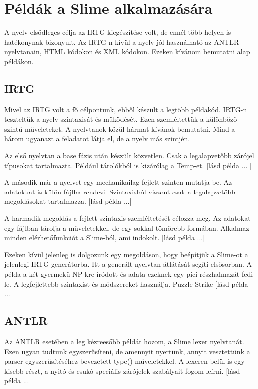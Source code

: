 {%
\section{Példák a Slime alkalmazására}
\label{sec:SExamples}

A nyelv elsődleges célja az IRTG kiegészítése volt, de ennél több helyen is hatékonynak bizonyult.
Az IRTG-n kívül a nyelv jól használható az ANTLR nyelvtanain, HTML kódokon és XML kódokon.
Ezeken kívánom bemutatni alap példákon.


\subsection{IRTG}
\label{sec:SEIRTG}
Mivel az IRTG volt a fő célpontunk, ebből készült a legtöbb példakód.
IRTG-n teszteltük a nyelv szintaxisát és működését.
Ezen szemléltettük a különböző szintű műveleteket.
A nyelvtanok közül hármat kívánok bemutatni.
Mind a három ugyanazt a feladatot látja el, de a nyelv más szintjén.

Az első nyelvtan a base fázis után készült közvetlen.
Csak a legalapvetőbb zárójel típusokat tartalmazta.
Például tárolókból is kizárólag a Temp-et.
[lásd példa ... ]

A második már a nyelvet egy mechanikailag fejlett szinten mutatja be.
Az adatokkat is külön fájlba rendezi.
Szintaxisból viszont csak a legalapvetőbb megoldásokat tartalmazza.
[lásd példa ...]

A harmadik megoldás a fejlett szintaxis szemléltetését célozza meg.
Az adatokat egy fájlban tárolja a műveletekkel, de egy sokkal tömörebb formában.
Alkalmaz minden elérhetőfunkciót a Slime-ból, ami indokolt.
[lásd példa ...]

Ezeken kívül jelenleg is dolgozunk egy megoldáson, hogy beépítjük a Slime-ot a jelenlegi IRTG generátorba.
Itt a generált nyelvtan átlátását segíti elsősorban.
A példa a két gyermekű NP-kre íródott és adata ezeknek egy pici részhalmazát fedi le.
A legfejlettebb szintaxist és módszereket használja. Puzzle Strike
[lásd példa ...]

\subsection{ANTLR}
\label{sec:SEANTLR}
Az ANTLR esetében a leg kézreesőbb példát hozom, a Slime lexer nyelvtanát. 
Ezen ugyan tudtunk egyszerűsíteni, de amennyit nyertünk, annyit vesztettünk a parser egyszerűsítéséhez bevezetett type() műveletekkel.
A lexeren belül is egy kisebb részt, a nyitó és csukó speciális zárójelek szabályait fogom leírni.
[lásd példa ...]

}
